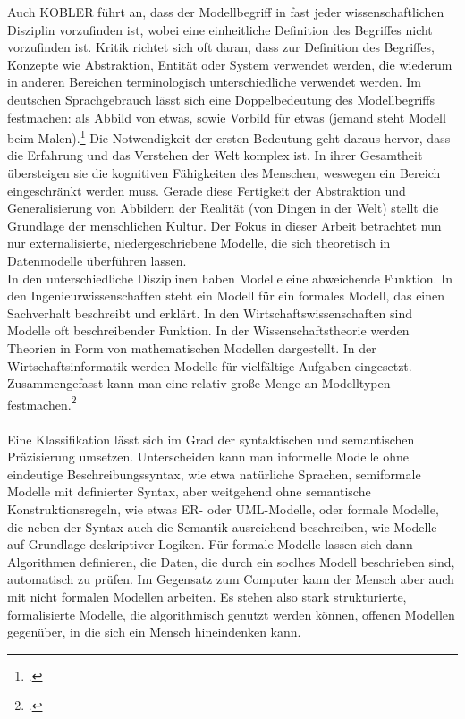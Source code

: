 \documentclass[12pt,a4paper]{article}
\begin{document}
Auch KOBLER führt an, dass der Modellbegriff in fast jeder wissenschaftlichen Disziplin vorzufinden ist, wobei eine einheitliche Definition des Begriffes nicht vorzufinden ist. Kritik richtet sich oft daran, dass zur Definition des Begriffes, Konzepte wie Abstraktion, Entität oder System verwendet werden, die wiederum in anderen Bereichen terminologisch unterschiedliche verwendet werden.
Im deutschen Sprachgebrauch lässt sich eine Doppelbedeutung des Modellbegriffs festmachen: als Abbild von etwas, sowie Vorbild für etwas (jemand steht Modell beim Malen).\footcite[][S.129]{stachowiak1973allgemeine} Die Notwendigkeit der ersten Bedeutung geht daraus hervor, dass die Erfahrung und das Verstehen der Welt komplex ist. In ihrer Gesamtheit übersteigen sie die kognitiven Fähigkeiten des Menschen, weswegen ein Bereich eingeschränkt werden muss. Gerade diese Fertigkeit der Abstraktion und Generalisierung von Abbildern der Realität (von Dingen in der Welt) stellt die Grundlage der menschlichen Kultur. Der Fokus in dieser Arbeit betrachtet nun nur externalisierte, niedergeschriebene Modelle, die sich theoretisch in Datenmodelle überführen lassen. 
\\
In den unterschiedliche Disziplinen haben Modelle eine abweichende Funktion. In den Ingenieurwissenschaften steht ein Modell für ein formales Modell, das einen Sachverhalt beschreibt und erklärt. In den Wirtschaftswissenschaften sind Modelle oft beschreibender Funktion. In der Wissenschaftstheorie werden Theorien in Form von mathematischen Modellen dargestellt. In der Wirtschaftsinformatik werden Modelle für vielfältige Aufgaben eingesetzt. Zusammengefasst kann man eine relativ große Menge an Modelltypen festmachen.\footcite[][S.41-44]{kobler2010qualitat}
\\
\\
Eine Klassifikation lässt sich im Grad der syntaktischen und semantischen Präzisierung umsetzen. Unterscheiden kann man informelle Modelle ohne eindeutige Beschreibungssyntax, wie etwa natürliche Sprachen, semiformale Modelle mit definierter Syntax, aber weitgehend ohne semantische Konstruktionsregeln, wie etwas ER- oder UML-Modelle, oder formale Modelle, die neben der Syntax auch die Semantik ausreichend beschreiben, wie Modelle auf Grundlage deskriptiver Logiken. Für formale Modelle lassen sich dann Algorithmen definieren, die Daten, die durch ein soclhes Modell beschrieben sind, automatisch zu prüfen. Im Gegensatz zum Computer kann der Mensch aber auch mit nicht formalen Modellen arbeiten. Es stehen also stark strukturierte, formalisierte Modelle, die algorithmisch genutzt werden können, offenen Modellen gegenüber, in die sich ein Mensch hineindenken kann.
\end{document}
